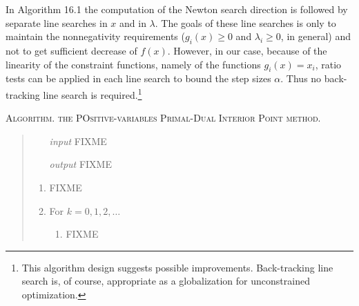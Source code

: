 \documentclass[11pt]{article}
\begin{document}
In Algorithm 16.1 the computation of the Newton search direction is followed by separate line searches in $x$ and in $\lambda$.  The goals of these line searches is only to maintain the nonnegativity requirements ($g_i(x)\ge 0$ and $\lambda_i\ge 0$, in general) and not to get sufficient decrease of $f(x)$.  However, in our case, because of the linearity of the constraint functions, namely of the functions $g_i(x)=x_i$, ratio tests can be applied in each line search to bound the step sizes $\alpha$.  Thus no back-tracking line search is required.\footnote{This algorithm design suggests possible improvements.  Back-tracking line search is, of course, appropriate as a globalization for unconstrained optimization.}


\bigskip
\noindent \textsc{Algorithm. the POsitive-variables Primal-Dual Interior Point method.}
\begin{quote}
\begin{itemize}
\item[\emph{input}]  FIXME
\item[\emph{output}]  FIXME
\end{itemize}
\renewcommand{\labelenumi}{\arabic{enumi}.}
\begin{enumerate}
\item FIXME
\item For $k=0,1,2,\dots$
    \renewcommand{\labelenumii}{(\alph{enumii})}
    \begin{enumerate}
    \item FIXME
    \end{enumerate}
\end{enumerate}
\end{quote}




\end{document}
